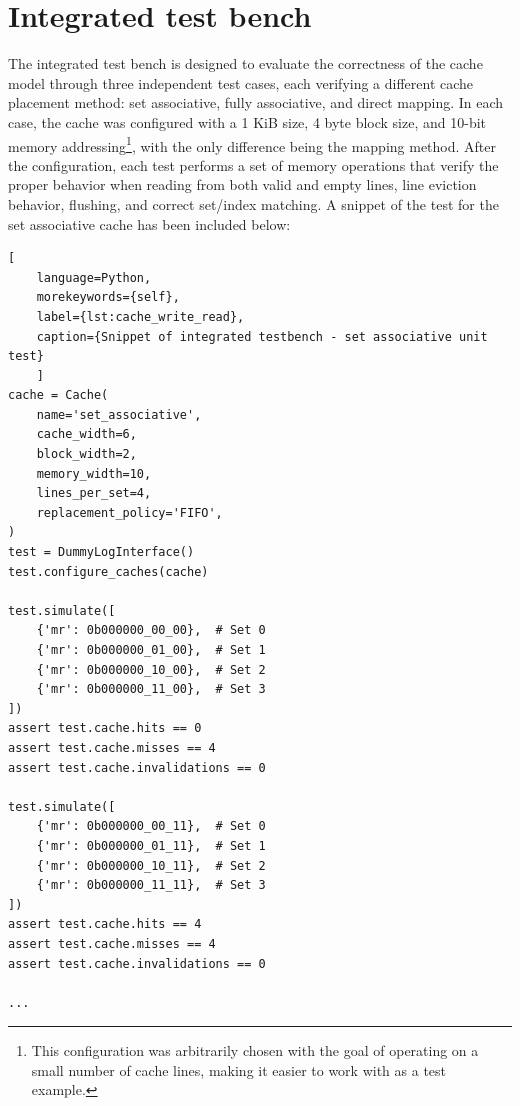 \section{Integrated test bench}
The integrated test bench is designed to evaluate the correctness of the cache model through three independent test cases, each verifying a different cache placement method:
set associative, fully associative, and direct mapping. In each case, the cache was configured with a 1 KiB size, 4 byte block size, and 10-bit memory addressing\footnote{This
configuration was arbitrarily chosen with the goal of operating on a small number of cache lines, making it easier to work with as a test example.}, with the only difference
being the mapping method. After the configuration, each test performs a set of memory operations that verify the proper behavior when reading from both valid and empty lines, line
eviction behavior, flushing, and correct set/index matching. A snippet of the test for the set associative cache has been included below:

\begin{center}
\centering
\begin{minipage}{\linewidth}
\begin{lstlisting}[
    language=Python,
	morekeywords={self},
    label={lst:cache_write_read},
    caption={Snippet of integrated testbench - set associative unit test}
    ]
cache = Cache(
    name='set_associative',
    cache_width=6,
    block_width=2,
    memory_width=10,
    lines_per_set=4,
    replacement_policy='FIFO',
)
test = DummyLogInterface()
test.configure_caches(cache)

test.simulate([
    {'mr': 0b000000_00_00},  # Set 0
    {'mr': 0b000000_01_00},  # Set 1
    {'mr': 0b000000_10_00},  # Set 2
    {'mr': 0b000000_11_00},  # Set 3
])
assert test.cache.hits == 0
assert test.cache.misses == 4
assert test.cache.invalidations == 0

test.simulate([
    {'mr': 0b000000_00_11},  # Set 0
    {'mr': 0b000000_01_11},  # Set 1
    {'mr': 0b000000_10_11},  # Set 2
    {'mr': 0b000000_11_11},  # Set 3
])
assert test.cache.hits == 4
assert test.cache.misses == 4
assert test.cache.invalidations == 0

...
\end{lstlisting}
\end{minipage}
\end{center}


